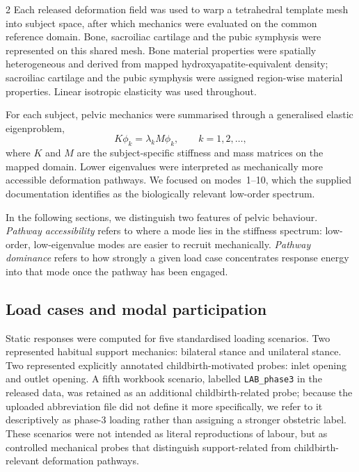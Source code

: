 \documentclass[openacc]{rsproca_new}
\begin{document}
\begin{multicols}{2}
Each released deformation field was used to warp a tetrahedral template mesh into subject space, after which mechanics were evaluated on the common reference domain. Bone, sacroiliac cartilage and the pubic symphysis were represented on this shared mesh. Bone material properties were spatially heterogeneous and derived from mapped hydroxyapatite-equivalent density; sacroiliac cartilage and the pubic symphysis were assigned region-wise material properties. Linear isotropic elasticity was used throughout.

For each subject, pelvic mechanics were summarised through a generalised elastic eigenproblem,
\begin{equation}
K\phi_{k} = \lambda_{k} M\phi_{k}, \qquad k=1,2,\ldots,
\end{equation}
where $K$ and $M$ are the subject-specific stiffness and mass matrices on the mapped domain. Lower eigenvalues were interpreted as mechanically more accessible deformation pathways. We focused on modes~1--10, which the supplied documentation identifies as the biologically relevant low-order spectrum.

In the following sections, we distinguish two features of pelvic behaviour. \emph{Pathway accessibility} refers to where a mode lies in the stiffness spectrum: low-order, low-eigenvalue modes are easier to recruit mechanically. \emph{Pathway dominance} refers to how strongly a given load case concentrates response energy into that mode once the pathway has been engaged.

\subsection{Load cases and modal participation}

Static responses were computed for five standardised loading scenarios. Two represented habitual support mechanics: bilateral stance and unilateral stance. Two represented explicitly annotated childbirth-motivated probes: inlet opening and outlet opening. A fifth workbook scenario, labelled \texttt{LAB\_phase3} in the released data, was retained as an additional childbirth-related probe; because the uploaded abbreviation file did not define it more specifically, we refer to it descriptively as phase-3 loading rather than assigning a stronger obstetric label. These scenarios were not intended as literal reproductions of labour, but as controlled mechanical probes that distinguish support-related from childbirth-relevant deformation pathways.


\end{multicols}
\end{document}
